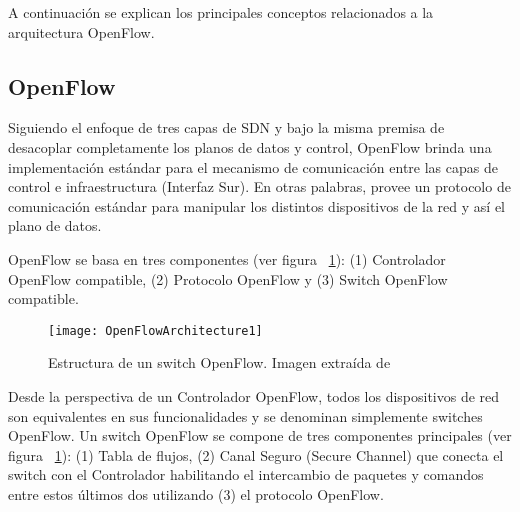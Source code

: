 A continuaci\'on se explican los principales conceptos relacionados a la arquitectura OpenFlow.

\subsection{OpenFlow}

Siguiendo el enfoque de tres capas de SDN y bajo la misma premisa de desacoplar completamente los planos de datos y control, OpenFlow \cite{mckeown2008openflow} brinda una implementaci\'on estándar para el mecanismo de comunicación entre las capas de control e infraestructura (Interfaz Sur). En otras palabras, provee un protocolo de comunicación estándar para manipular los distintos dispositivos de la red y así el plano de datos.

OpenFlow se basa en tres componentes (ver figura ~\ref{fig:OpenFlowArch}): (1) Controlador OpenFlow compatible, (2) Protocolo OpenFlow y (3) Switch OpenFlow compatible.

  


\begin{figure}[htbp!] 
\centering    
\texttt{[image: OpenFlowArchitecture1]}
\caption[Estructura de un switch OpenFlow]{Estructura de un switch OpenFlow. Imagen extraída de \cite{mckeown2008openflow}}
\label{fig:OpenFlowArch}
\end{figure}

Desde la perspectiva de un Controlador OpenFlow, todos los dispositivos de red son equivalentes en sus funcionalidades y se denominan simplemente switches OpenFlow. Un switch OpenFlow se compone de tres componentes principales (ver figura ~\ref{fig:OpenFlowArch}): (1) Tabla de flujos, (2) Canal Seguro 
 (Secure Channel) que conecta el switch con el Controlador habilitando el intercambio de paquetes y comandos entre estos últimos dos utilizando (3) el protocolo OpenFlow.
 
